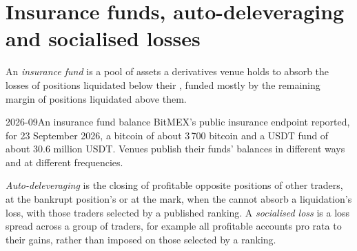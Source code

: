 \section{Insurance funds, auto-deleveraging and socialised losses}

\begin{definition}\label{def:m3:margin-liquidation-and-loss-allocation:fund}
An \emph{insurance fund} is a pool of assets a derivatives venue holds to absorb the losses
of positions liquidated below their , funded mostly by the remaining margin of positions
liquidated above them.
\end{definition}

\begin{dated}{2026-09}{An insurance fund balance}\label{dat:m3:margin-liquidation-and-loss-allocation:fund}
BitMEX's public insurance endpoint reported, for 23 September 2026, a bitcoin  of about 3\,700
bitcoin and a USDT fund of about 30.6 million USDT. Venues publish their funds' balances in different ways and at
different frequencies.
\end{dated}

\begin{definition}\label{def:m3:margin-liquidation-and-loss-allocation:adl}
\emph{Auto-deleveraging} is the closing of profitable opposite positions of other traders,
at the bankrupt position's  or at the mark, when the  cannot absorb a liquidation's
loss, with those traders selected by a published ranking. A \emph{socialised loss} is a
loss spread across a group of traders, for example all profitable accounts pro rata to their gains, rather than
imposed on those selected by a ranking.
\end{definition}


